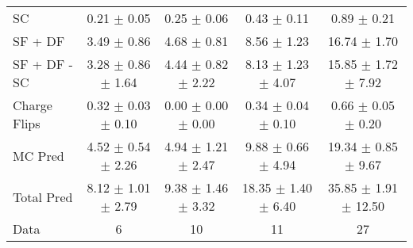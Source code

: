 \begin{tabular}{l|cccc}
                                 SC &  0.21 $\pm$  0.05 &  0.25 $\pm$  0.06 &  0.43 $\pm$  0.11 &  0.89 $\pm$  0.21 \\
                            SF + DF &  3.49 $\pm$  0.86 &  4.68 $\pm$  0.81 &  8.56 $\pm$  1.23 & 16.74 $\pm$  1.70 \\
\hline
                       SF + DF - SC &  3.28 $\pm$  0.86 $\pm$  1.64 &  4.44 $\pm$  0.82 $\pm$  2.22 &  8.13 $\pm$  1.23 $\pm$  4.07 & 15.85 $\pm$  1.72 $\pm$  7.92 \\
\hline\hline
                       Charge Flips &  0.32 $\pm$  0.03 $\pm$  0.10 &  0.00 $\pm$  0.00 $\pm$  0.00 &  0.34 $\pm$  0.04 $\pm$  0.10 &  0.66 $\pm$  0.05 $\pm$  0.20 \\
\hline
                            MC Pred &  4.52 $\pm$  0.54 $\pm$  2.26 &  4.94 $\pm$  1.21 $\pm$  2.47 &  9.88 $\pm$  0.66 $\pm$  4.94 & 19.34 $\pm$  0.85 $\pm$  9.67 \\
\hline
                         Total Pred &  8.12 $\pm$  1.01 $\pm$  2.79 &  9.38 $\pm$  1.46 $\pm$  3.32 & 18.35 $\pm$  1.40 $\pm$  6.40 & 35.85 $\pm$  1.91 $\pm$ 12.50 \\
\hline\hline
                               Data &     6 &    10 &    11 &    27 \\
\hline\hline
\end{tabular}

